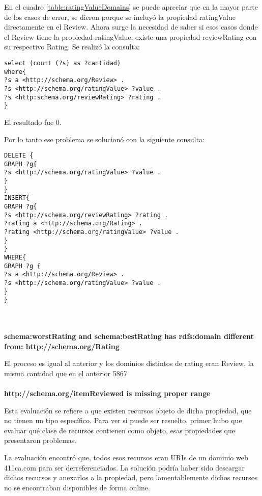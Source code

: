 En el cuadro \ref{table:ratingValueDomains} se puede apreciar que en la mayor parte de los casos de error, se dieron porque se incluyó la propiedad ratingValue directamente en 
el Review. Ahora surge la necesidad de saber si esos casos donde el Review tiene la propiedad ratingValue, existe una propiedad reviewRating 
con su respectivo Rating.
Se realizó la consulta:

\begin{lstlisting}[frame=single]  
select (count (?s) as ?cantidad) 
where{
?s a <http://schema.org/Review> . 
?s <http://schema.org/ratingValue> ?value . 
?s <http:schema.org/reviewRating> ?rating . 
}
\end{lstlisting}

El resultado fue 0.

Por lo tanto ese problema se solucionó con la siguiente consulta:
\newpage
\begin{lstlisting}[frame=single]  
DELETE { 
GRAPH ?g{ 
?s <http://schema.org/ratingValue> ?value . 
} 
} 
INSERT{ 
GRAPH ?g{ 
?s <http://schema.org/reviewRating> ?rating . 
?rating a <http://schema.org/Rating> . 
?rating <http://schema.org/ratingValue> ?value . 
}
}
WHERE{
GRAPH ?g {
?s a <http://schema.org/Review> .
?s <http://schema.org/ratingValue> ?value .
}
}
\end{lstlisting}

~\\\\


\noindent\textbf{ schema:worstRating and schema:bestRating has rdfs:domain different from: http://schema.org/Rating}

El proceso es igual al anterior y los dominios distintos de rating eran Review, la misma cantidad que en el anterior 5867
\\\\
\textbf{http://schema.org/itemReviewed is missing proper range}

Esta evaluación se refiere a que existen recursos objeto de dicha propiedad, que no tienen un tipo específico. Para ver si 
puede ser resuelto, primer hubo que evaluar qué clase de recursos contienen como objeto, esas propiedades que presentaron problemas.

La evaluación encontró que, todos esos recursos eran URIs de un dominio web 411ca.com para ser derreferenciados. La solución podría haber sido 
descargar dichos recursos y anexarlos a la propiedad, pero lamentablemente dichos recursos no se encontraban disponibles de forma online.

